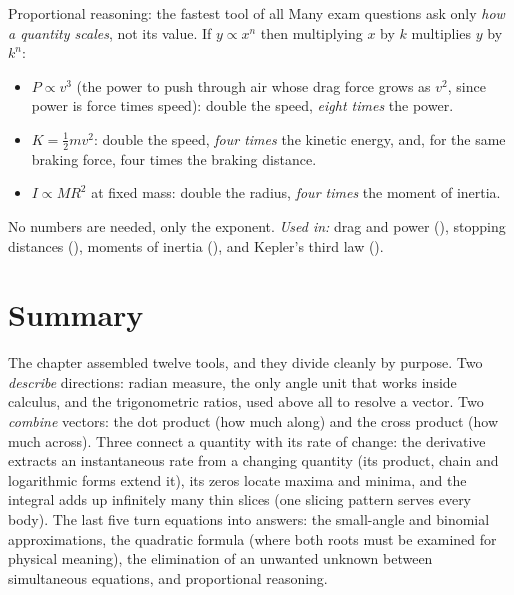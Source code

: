 \begin{methodbox}{Proportional reasoning: the fastest tool of all}
Many exam questions ask only \emph{how a quantity scales}, not its value. If $y\propto x^{n}$ then
multiplying $x$ by $k$ multiplies $y$ by $k^{n}$:
\begin{itemize}
\item $P\propto v^{3}$ (the power to push through air whose drag force grows as $v^2$, since power is
      force times speed): double the speed, \emph{eight times} the power.
\item $K=\tfrac12mv^{2}$: double the speed, \emph{four times} the kinetic energy, and, for the same
      braking force, four times the braking distance.
\item $I\propto MR^{2}$ at fixed mass: double the radius, \emph{four times} the moment of inertia.
\end{itemize}
No numbers are needed, only the exponent. \emph{Used in:} drag and power (), stopping
distances (), moments of inertia (), and Kepler's third law
().
\end{methodbox}

\section{Summary}\label{sec:summary0}
The chapter assembled twelve tools, and they divide cleanly by purpose. Two \emph{describe}
directions: radian measure, the only angle unit that works inside calculus, and the trigonometric
ratios, used above all to resolve a vector. Two \emph{combine} vectors: the dot product (how much
along) and the cross product (how much across). Three connect a quantity with its rate of change: the derivative extracts an
instantaneous rate from a changing quantity (its product, chain and logarithmic forms extend it), its
zeros locate maxima and minima, and the integral adds up infinitely many thin slices (one slicing
pattern serves every body). The last five turn equations into answers: the small-angle and binomial
approximations, the quadratic formula (where both roots must be
examined for physical meaning), the elimination of an unwanted unknown between simultaneous equations,
and proportional reasoning.

